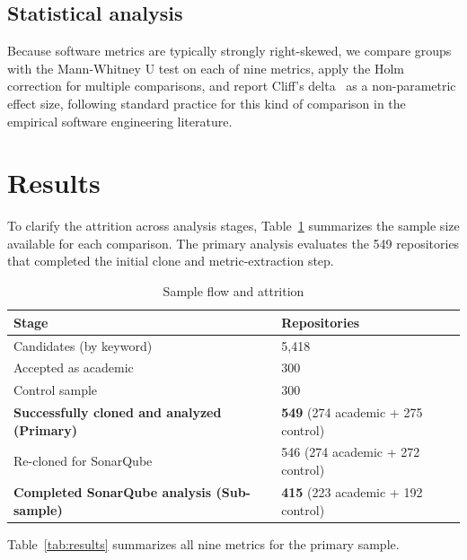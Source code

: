 \documentclass{cleiej}
\providecommand{\citep}[1]{\cite{#1}}
\begin{document}
\subsection{Statistical analysis}
Because software metrics are typically strongly right-skewed, we compare groups with the Mann-Whitney U test on each of nine metrics, apply the Holm correction for multiple comparisons, and report Cliff's delta~\citep{cliff1993dominance} as a non-parametric effect size, following standard practice for this kind of comparison in the empirical software engineering literature.

\section{Results}

To clarify the attrition across analysis stages, Table~\ref{tab:flow} summarizes the sample size available for each comparison. The primary analysis evaluates the 549 repositories that completed the initial clone and metric-extraction step.

\begin{table}[h]
\centering
\caption{Sample flow and attrition}
\label{tab:flow}
\begin{tabular}{ll}
\toprule
Stage & Repositories \\
\midrule
Candidates (by keyword) & 5{,}418 \\
Accepted as academic & 300 \\
Control sample & 300 \\
\textbf{Successfully cloned and analyzed (Primary)} & \textbf{549} (274 academic + 275 control) \\
Re-cloned for SonarQube & 546 (274 academic + 272 control) \\
\textbf{Completed SonarQube analysis (Sub-sample)} & \textbf{415} (223 academic + 192 control) \\
\bottomrule
\end{tabular}
\end{table}

Table~\ref{tab:results} summarizes all nine metrics for the primary sample.
\end{document}
